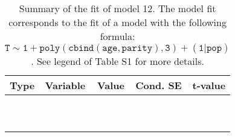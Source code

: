 \begin{table}[H]

\caption{\label{tab:tab12}Summary of the fit of model 12. The model fit corresponds to the fit of a model with the following formula: {\small$\mathtt{T \sim 1 + poly(cbind(age, parity), 3) + (1 | pop)}$}. See legend of Table S1 for more details.}
\centering
\fontsize{8}{10}\selectfont
\begin{tabular}[t]{>{\raggedright\arraybackslash}p{3cm}>{\raggedright\arraybackslash}p{5cm}rrr}
\toprule
Type & Variable & Value & Cond. SE & t-value\\
\midrule
\cellcolor{gray!6}{fixed effects} & \cellcolor{gray!6}{$\beta_1$} & \cellcolor{gray!6}{-4.08} & \cellcolor{gray!6}{0.111} & \cellcolor{gray!6}{-36.8}\\
\cellcolor{gray!6}{} & \cellcolor{gray!6}{$\beta_{\mathtt{age}}$} & \cellcolor{gray!6}{71} & \cellcolor{gray!6}{30.7} & \cellcolor{gray!6}{2.32}\\
\cellcolor{gray!6}{} & \cellcolor{gray!6}{$\beta_{\mathtt{age}^2}$} & \cellcolor{gray!6}{-60.7} & \cellcolor{gray!6}{17} & \cellcolor{gray!6}{-3.57}\\
\cellcolor{gray!6}{} & \cellcolor{gray!6}{$\beta_{\mathtt{age}^3}$} & \cellcolor{gray!6}{-47.2} & \cellcolor{gray!6}{16.3} & \cellcolor{gray!6}{-2.9}\\
\cellcolor{gray!6}{} & \cellcolor{gray!6}{$\beta_{\mathtt{parity}}$} & \cellcolor{gray!6}{1.54} & \cellcolor{gray!6}{39.4} & \cellcolor{gray!6}{0.0392}\\
\cellcolor{gray!6}{} & \cellcolor{gray!6}{$\beta_{\mathtt{age}\times\mathtt{parity}}$} & \cellcolor{gray!6}{-4468} & \cellcolor{gray!6}{11667} & \cellcolor{gray!6}{-0.383}\\
\cellcolor{gray!6}{} & \cellcolor{gray!6}{$\beta_{\mathtt{age}^2\times\mathtt{parity}}$} & \cellcolor{gray!6}{7856} & \cellcolor{gray!6}{8568} & \cellcolor{gray!6}{0.917}\\
\cellcolor{gray!6}{} & \cellcolor{gray!6}{$\beta_{\mathtt{parity}^2}$} & \cellcolor{gray!6}{19.3} & \cellcolor{gray!6}{26.7} & \cellcolor{gray!6}{0.721}\\
\cellcolor{gray!6}{} & \cellcolor{gray!6}{$\beta_{\mathtt{age}\times\mathtt{parity}^2}$} & \cellcolor{gray!6}{-4441} & \cellcolor{gray!6}{7983} & \cellcolor{gray!6}{-0.556}\\
\cellcolor{gray!6}{} & \cellcolor{gray!6}{$\beta_{\mathtt{parity}^3}$} & \cellcolor{gray!6}{-18.8} & \cellcolor{gray!6}{13.9} & \cellcolor{gray!6}{-1.35}\\

\end{tabular}
\end{table}
